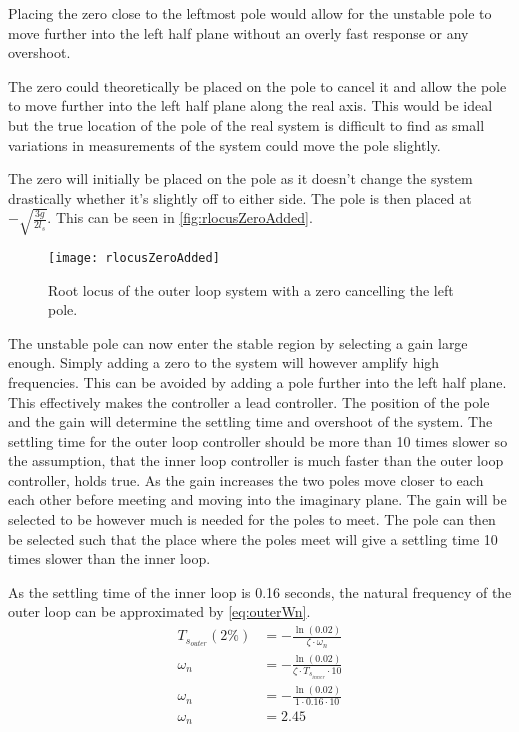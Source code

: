 Placing the zero close to the leftmost pole would allow for the unstable pole to move further into the left half plane without an overly fast response or any overshoot. 

The zero could theoretically be placed on the pole to cancel it and allow the pole to move further into the left half plane along the real axis. This would be ideal but the true location of the pole of the real system is difficult to find as small variations in measurements of the system could move the pole slightly. 

The zero will initially be placed on the pole as it doesn't change the system drastically whether it's slightly off to either side. The pole is then placed at $-\sqrt{\frac{3g}{2l_s}}$. This can be seen in \autoref{fig:rlocusZeroAdded}.

\begin{figure}[htbp]
\centering
\texttt{[image: rlocusZeroAdded]}
\caption{Root locus of the outer loop system with a zero cancelling the left pole.}
\label{fig:rlocusZeroAdded}
\end{figure}

The unstable pole can now enter the stable region by selecting a gain large enough. Simply adding a zero to the system will however amplify high frequencies. This can be avoided by adding a pole further into the left half plane. This effectively makes the controller a lead controller. The position of the pole and the gain will determine the settling time and overshoot of the system. The settling time for the outer loop controller should be more than 10 times slower so the assumption, that the inner loop controller is much faster than the outer loop controller, holds true. As the gain increases the two poles move closer to each each other before meeting and moving into the imaginary plane. The gain will be selected to be however much is needed for the poles to meet. The pole can then be selected such that the place where the poles meet will give a settling time 10 times slower than the inner loop.

As the settling time of the inner loop is 0.16 seconds, the natural frequency of the outer loop can be approximated by \autoref{eq:outerWn}. 
\begin{subequations} \label{eq:outerWn}
\begin{flalign}
T_{s_{outer}}(2\%) &=-\frac{\ln(0.02)}{\zeta\cdot \omega_n} \\
\omega_n &=-\frac{\ln(0.02)}{\zeta\cdot T_{s_{inner}}\cdot 10} \\
\omega_n &=-\frac{\ln(0.02)}{1\cdot 0.16 \cdot 10} \\
\omega_n &=2.45
\end{flalign}
\end{subequations}


